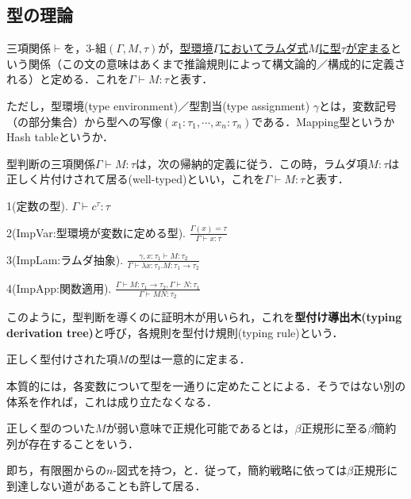 \documentclass[uplatex, dvipdfmx]{jsreport}
\begin{document}
\subsection{型の理論}

\begin{definition}
    三項関係$\vdash$を，3-組$(\Gamma,M,\tau)$が，\underline{型環境$\Gamma$においてラムダ式$M$に型$\tau$が定まる}という関係（この文の意味はあくまで推論規則によって構文論的／構成的に定義される）と定める．これを$\Gamma\vdash M:\tau$と表す．

    ただし，型環境(type environment)／型割当(type assignment) $\gamma$とは，変数記号（の部分集合）から型への写像$(x_1:\tau_1,\cdots,x_n:\tau_n)$である．Mapping型というかHash tableというか．
\end{definition}
\begin{definition}
    型判断の三項関係$\Gamma\vdash M:\tau$は，次の帰納的定義に従う．この時，ラムダ項$M:\tau$は正しく片付けされて居る(well-typed)といい，これを$\Gamma\vdash M:\tau$と表す．

    1(定数の型). $\Gamma\vdash c^\tau:\tau$

    2(ImpVar:型環境が変数に定める型). $\frac{\Gamma(x)=\tau}{\Gamma\vdash x:\tau}$

    3(ImpLam:ラムダ抽象). $\frac{\gamma,x:\tau_1\vdash M:\tau_2}{\Gamma\vdash\lambda x:\tau_1.M:\tau_1\to\tau_2}$

    4(ImpApp:関数適用). $\frac{\Gamma\vdash M:\tau_1\to\tau_2, \Gamma\vdash N:\tau_1}{\Gamma\vdash MN:\tau_2}$
\end{definition}
\begin{remark}
    このように，型判断を導くのに証明木が用いられ，これを\textbf{型付け導出木(typing derivation tree)}と呼び，各規則を型付け規則(typing rule)という．
\end{remark}

\begin{proposition}[型付けの一意性]
    正しく型付けされた項$M$の型は一意的に定まる．
\end{proposition}
\begin{remark}
    本質的には，各変数について型を一通りに定めたことによる．そうではない別の体系を作れば，これは成り立たなくなる．
\end{remark}

\begin{definition}
    正しく型のついた$M$が弱い意味で正規化可能であるとは，$\beta$正規形に至る$\beta$簡約列が存在することをいう．
\end{definition}
\begin{remark}
    即ち，有限圏からの$n$-図式を持つ，と．従って，簡約戦略に依っては$\beta$正規形に到達しない道があることも許して居る．
\end{remark}
\end{document}
